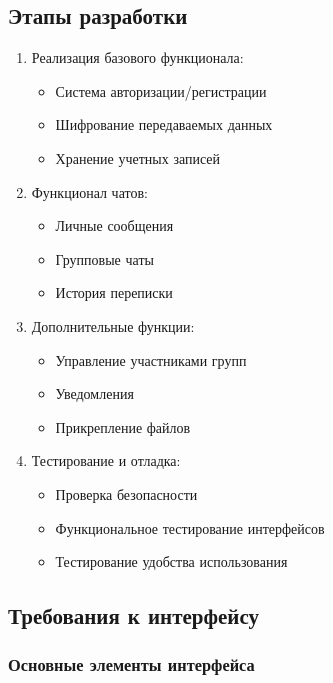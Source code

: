 \subsection{Этапы разработки}
\begin{enumerate}
	\item Реализация базового функционала:
	\begin{itemize}
		\item Система авторизации/регистрации
		\item Шифрование передаваемых данных
		\item Хранение учетных записей
	\end{itemize}
	
	\item Функционал чатов:
	\begin{itemize}
		\item Личные сообщения
		\item Групповые чаты
		\item История переписки
	\end{itemize}
	
	\item Дополнительные функции:
	\begin{itemize}
		\item Управление участниками групп
		\item Уведомления
		\item Прикрепление файлов
	\end{itemize}
	
	\item Тестирование и отладка:
	\begin{itemize}
        \item Проверка безопасности
		\item Функциональное тестирование интерфейсов
		\item Тестирование удобства использования
	\end{itemize}
\end{enumerate}

\subsection{Требования к интерфейсу}

\subsubsection{Основные элементы интерфейса}

